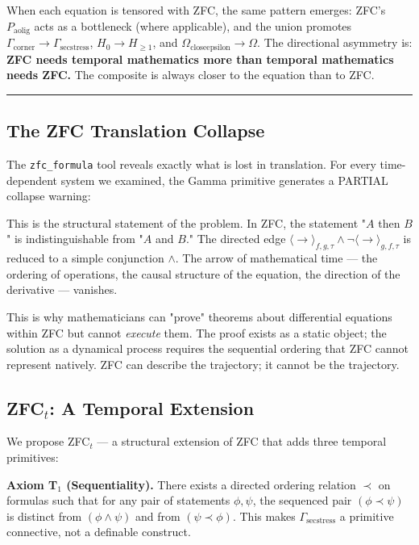 \documentclass[12pt,a4paper]{article}
\begin{document}
When each equation is tensored with ZFC, the same pattern emerges: ZFC's $P_{\text{aolig}}$ acts as a bottleneck (where applicable), and the union promotes $\Gamma_{\text{corner}} \to \Gamma_{\text{secstress}}$, $H_0 \to H_{\geq 1}$, and $\Omega_{\text{closeepsilon}} \to \Omega$. The directional asymmetry is: \textbf{ZFC needs temporal mathematics more than temporal mathematics needs ZFC.} The composite is always closer to the equation than to ZFC.

\begin{center}
\rule{0.5\textwidth}{0.4pt}
\end{center}

\subsection{The ZFC Translation Collapse}

The \texttt{zfc\_formula} tool reveals exactly what is lost in translation. For every time-dependent system we examined, the Gamma primitive generates a PARTIAL collapse warning:

\begin{quote}
\end{quote}

This is the structural statement of the problem. In ZFC, the statement "$A$ then $B$" is indistinguishable from "$A$ and $B$." The directed edge $\langle\to\rangle_{f,g,\tau} \wedge \neg\langle\to\rangle_{g,f,\tau}$ is reduced to a simple conjunction $\wedge$. The arrow of mathematical time --- the ordering of operations, the causal structure of the equation, the direction of the derivative --- vanishes.

This is why mathematicians can "prove" theorems about differential equations within ZFC but cannot \emph{execute} them. The proof exists as a static object; the solution as a dynamical process requires the sequential ordering that ZFC cannot represent natively. ZFC can describe the trajectory; it cannot be the trajectory.

\subsection{ZFC$_t$: A Temporal Extension}

We propose ZFC$_t$ --- a structural extension of ZFC that adds three temporal primitives:

\textbf{Axiom T$_1$ (Sequentiality).} There exists a directed ordering relation $\prec$ on formulas such that for any pair of statements $\phi, \psi$, the sequenced pair $(\phi \prec \psi)$ is distinct from $(\phi \wedge \psi)$ and from $(\psi \prec \phi)$. This makes $\Gamma_{\text{secstress}}$ a primitive connective, not a definable construct.
\end{document}
